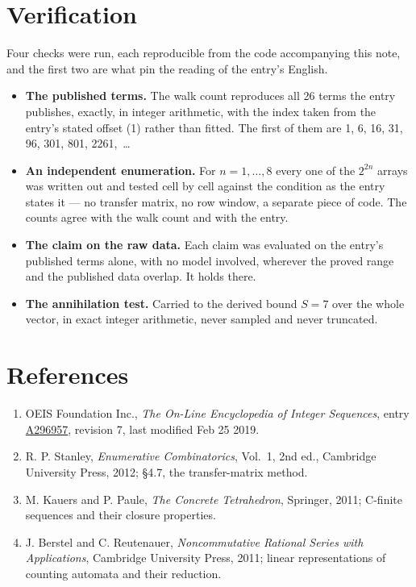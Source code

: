 \documentclass[11pt]{article}
\theoremstyle{definition}
\begin{document}
\section{Verification}

Four checks were run, each reproducible from the code accompanying this note, and the first two are what pin the reading of the entry's English.

\begin{itemize}

\item {\bfseries The published terms.} The walk count reproduces all 26 terms the entry publishes, exactly, in integer arithmetic, with the index taken from the entry's stated offset (1) rather than fitted. The first of them are 1, 6, 16, 31, 96, 301, 801, 2261,~\dots

\item {\bfseries An independent enumeration.} For $n = 1,\dots,8$ every one of the $2^{2n}$ arrays was written out and tested cell by cell against the condition as the entry states it --- no transfer matrix, no row window, a separate piece of code. The counts agree with the walk count and with the entry.

\item {\bfseries The claim on the raw data.} Each claim was evaluated on the entry's published terms alone, with no model involved, wherever the proved range and the published data overlap. It holds there.

\item {\bfseries The annihilation test.} Carried to the derived bound $S = 7$ over the whole vector, in exact integer arithmetic, never sampled and never truncated.

\end{itemize}

\section{References}

\begin{enumerate}

\item OEIS Foundation Inc., \emph{The On-Line Encyclopedia of Integer Sequences}, entry \href{https://oeis.org/A296957}{A296957}, revision 7, last modified Feb 25 2019.

\item R. P. Stanley, \emph{Enumerative Combinatorics}, Vol.~1, 2nd ed., Cambridge University Press, 2012; \S4.7, the transfer-matrix method.

\item M. Kauers and P. Paule, \emph{The Concrete Tetrahedron}, Springer, 2011; C-finite sequences and their closure properties.

\item J. Berstel and C. Reutenauer, \emph{Noncommutative Rational Series with Applications}, Cambridge University Press, 2011; linear representations of counting automata and their reduction.

\end{enumerate}
\end{document}
